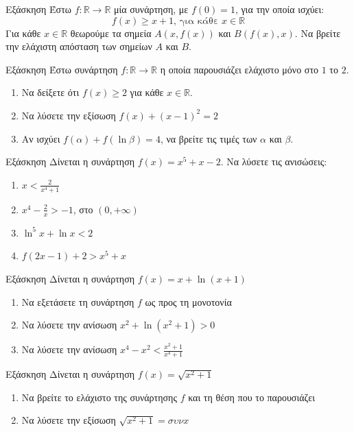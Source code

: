 \documentclass[greek]{beamer}
\begin{document}
\begin{frame}{Εξάσκηση}
 Έστω $f:\mathbb{R}\to\mathbb{R}$ μία συνάρτηση, με $f(0)=1$, για την οποία ισχύει:
 $$f(x)\ge x+1 \text{, για κάθε } x\in\mathbb{R}$$
 Για κάθε $x\in\mathbb{R}$ θεωρούμε τα σημεία $Α(x,f(x))$ και $Β(f(x),x)$. Να βρείτε την ελάχιστη απόσταση των σημείων $Α$ και $Β$.
\end{frame}

\begin{frame}{Εξάσκηση}
 Έστω συνάρτηση $f:\mathbb{R}\to \mathbb{R}$ η οποία παρουσιάζει ελάχιστο μόνο στο $1$ το $2$.
 \begin{enumerate}
  \item Να δείξετε ότι $f(x)\ge 2$ για κάθε $x\in\mathbb{R}$. \pause
  \item Να λύσετε την εξίσωση $f(x)+(x-1)^2=2$ \pause
  \item Αν ισχύει $f(α)+f(\ln β)=4$, να βρείτε τις τιμές των $α$ και $β$.
 \end{enumerate}
\end{frame}

\begin{frame}{Εξάσκηση}
 Δίνεται η συνάρτηση $f(x)=x^5+x-2$. Να λύσετε τις ανισώσεις:
 \begin{enumerate}
  \item $x<\frac{2}{x^4+1}$ \pause
  \item $x^4-\frac{2}{x}>-1$, στο $(0,+\infty)$ \pause
  \item $\ln^5 x+\ln x<2$ \pause
  \item $f(2x-1)+2>x^5+x$
 \end{enumerate}
\end{frame}

\begin{frame}{Εξάσκηση}
 Δίνεται η συνάρτηση $f(x)=x+\ln (x+1)$
 \begin{enumerate}
  \item Να εξετάσετε τη συνάρτηση $f$ ως προς τη μονοτονία \pause
  \item Να λύσετε την ανίσωση $x^2+\ln (x^2+1)>0$ \pause
  \item Να λύσετε την ανίσωση $x^4-x^2<\frac{x^2+1}{x^4+1}$
 \end{enumerate}
\end{frame}

\begin{frame}{Εξάσκηση}
 Δίνεται η συνάρτηση $f(x)=\sqrt{x^2+1}$
 \begin{enumerate}
  \item Να βρείτε το ελάχιστο της συνάρτησης $f$ και τη θέση που το παρουσιάζει \pause
  \item Να λύσετε την εξίσωση $\sqrt{x^2+1}=συν x$
 \end{enumerate}
\end{frame}
\end{document}
